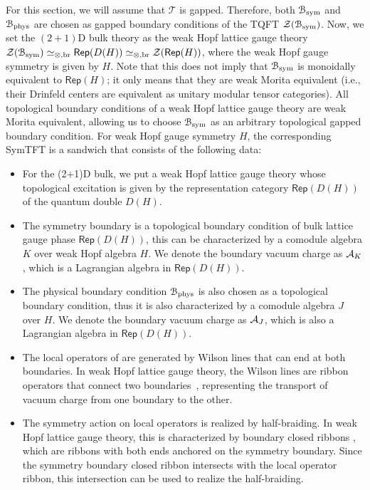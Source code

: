 \documentclass[a4paper,11pt]{article}
\theoremstyle{theorem}
\theoremstyle{remark}
\newcommand\eB           {\EuScript{B}}
\newcommand{\Rep}{\mathsf{Rep}}
\newcommand{\cA}{\text{\usefont{OMS}{cmsy}{m}{n}A}}
\begin{document}

For this section, we will assume that \(\mathcal{T}\) is gapped. Therefore, both \(\eB_{\rm sym}\) and \(\eB_{\rm phys}\) are chosen as gapped boundary conditions of the TQFT \(\mathcal{Z}(\eB_{\rm sym})\). Now, we set the \((2+1)\)D bulk theory as the weak Hopf lattice gauge theory \(\mathcal{Z}(\eB_{\rm sym}) \simeq_{\otimes, \rm br} \Rep(D(H)) \simeq_{\otimes, \rm br} \mathcal{Z}(\Rep(H))\), where the weak Hopf gauge symmetry is given by \(H\).
Note that this does not imply that \(\eB_{\rm sym}\) is monoidally equivalent to \(\Rep(H)\); it only means that they are weak Morita equivalent (i.e., their Drinfeld centers are equivalent as unitary modular tensor categories). All topological boundary conditions of a weak Hopf lattice gauge theory are weak Morita equivalent, allowing us to choose \(\eB_{\rm sym}\) as an arbitrary topological gapped boundary condition.
For weak Hopf gauge symmetry $H$, the corresponding SymTFT is a sandwich that consists of the following data:
\begin{itemize}
    \item For the (2+1)D bulk, we put a weak Hopf lattice gauge theory whose topological excitation is given by the representation category $\Rep(D(H))$ of the quantum double $D(H)$.
    \item The symmetry boundary is a topological boundary condition of bulk lattice gauge phase $\Rep(D(H))$, this can be characterized by a comodule algebra $K$ over weak Hopf algebra $H$. We denote the boundary vacuum charge as $\cA_K$, which is a Lagrangian algebra in $\Rep(D(H))$.
    \item The physical boundary condition $\eB_{\rm phys}$ is also chosen as a topological boundary condition, thus it is also characterized by a comodule algebra $J$ over $H$. We denote the boundary vacuum charge as $\cA_J$, which is also a Lagrangian algebra in $\Rep(D(H))$.
    \item The local operators of are generated by Wilson lines that can end at both boundaries. In weak Hopf lattice gauge theory, the Wilson lines are ribbon operators that connect two boundaries~\cite{meusburger2021hopf,meusburger2017kitaev,chen2021ribbon,jia2023boundary,Jia2023weak}, representing the transport of vacuum charge from one boundary to the other.
    \item The symmetry action on local operators is realized by half-braiding. In weak Hopf lattice gauge theory, this is characterized by boundary closed ribbons \cite{meusburger2021hopf,meusburger2017kitaev,chen2021ribbon,jia2023boundary,Jia2023weak}, which are ribbons with both ends anchored on the symmetry boundary. Since the symmetry boundary closed ribbon intersects with the local operator ribbon, this intersection can be used to realize the half-braiding.
\end{itemize}
\end{document}
